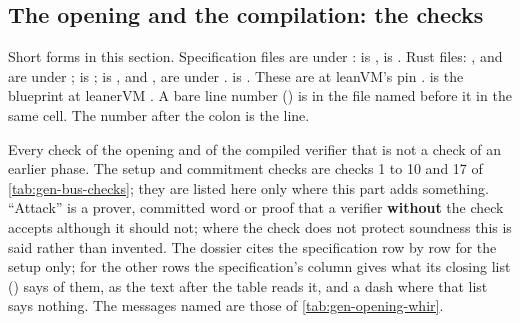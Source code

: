 \subsection{The opening and the compilation: the checks}\label{sec:gen-opening-checks}

\begin{sloppypar}
Short forms in this section. Specification files are under :  is
,  is . Rust files:
,  and  are under ;
 is ;  is ,
and ,  are under .  is
. These are at leanVM's pin .  is the
blueprint at leanerVM . A bare line number () is in the file named before
it in the same cell. The number after the colon is the line.
\end{sloppypar}

Every check of the opening and of the compiled verifier that is not a check of an earlier phase.
The setup and commitment checks are checks 1 to 10 and 17 of \cref{tab:gen-bus-checks}; they are
listed here only where this part adds something. ``Attack'' is a prover, committed word or proof
that a verifier \textbf{without} the check accepts although it should not; where the check does
not protect soundness this is said rather than invented. The dossier cites the specification row
by row for the setup only; for the other rows the specification's column gives what its closing
list () says of them, as the text after the table reads it, and a dash where that
list says nothing. The messages named are those of \cref{tab:gen-opening-whir}.

